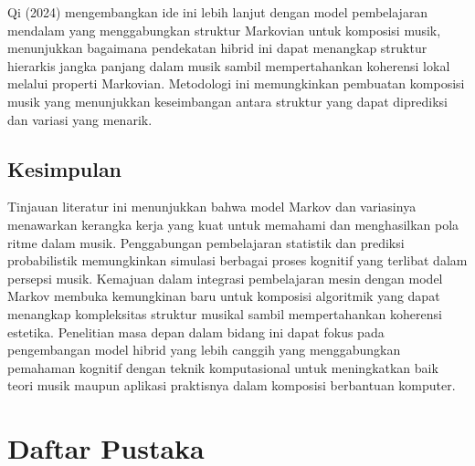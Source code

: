 \documentclass[a4paper,12pt]{article}
\begin{document}
Qi (2024) mengembangkan ide ini lebih lanjut dengan model pembelajaran mendalam yang menggabungkan struktur Markovian untuk komposisi musik, menunjukkan bagaimana pendekatan hibrid ini dapat menangkap struktur hierarkis jangka panjang dalam musik sambil mempertahankan koherensi lokal melalui properti Markovian. Metodologi ini memungkinkan pembuatan komposisi musik yang menunjukkan keseimbangan antara struktur yang dapat diprediksi dan variasi yang menarik.

\subsection*{Kesimpulan}

Tinjauan literatur ini menunjukkan bahwa model Markov dan variasinya menawarkan kerangka kerja yang kuat untuk memahami dan menghasilkan pola ritme dalam musik. Penggabungan pembelajaran statistik dan prediksi probabilistik memungkinkan simulasi berbagai proses kognitif yang terlibat dalam persepsi musik. Kemajuan dalam integrasi pembelajaran mesin dengan model Markov membuka kemungkinan baru untuk komposisi algoritmik yang dapat menangkap kompleksitas struktur musikal sambil mempertahankan koherensi estetika. Penelitian masa depan dalam bidang ini dapat fokus pada pengembangan model hibrid yang lebih canggih yang menggabungkan pemahaman kognitif dengan teknik komputasional untuk meningkatkan baik teori musik maupun aplikasi praktisnya dalam komposisi berbantuan komputer.

\vspace{1cm}

\section*{Daftar Pustaka}
\end{document}
